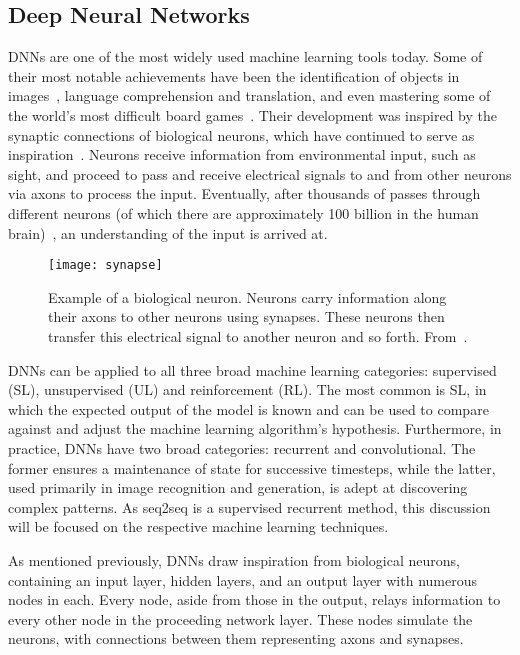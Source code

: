 \subsection{Deep Neural Networks}\label{dnn}
DNNs are one of the most widely used machine learning tools today. Some of their most notable achievements have been the identification of objects in images~\cite{LeCun1989}, language comprehension and translation\cite{Mikolov2010,Mikolov2011}, and even mastering some of the world's most difficult board games~\cite{Silver2016}. Their development was inspired by the synaptic connections of biological neurons, which have continued to serve as inspiration~\cite{Schmidhuber2015}. Neurons receive information from environmental input, such as sight, and proceed to pass and receive electrical signals to and from other neurons via axons to process the input. Eventually, after thousands of passes through different neurons (of which there are approximately 100 billion in the human brain)~\cite{Goodfellow2016}, an understanding of the input is arrived at.

\begin{SCfigure}[1][h]
  \caption[Example of a biological neuron]{Example of a biological neuron. Neurons carry information along their axons to other neurons using synapses. These neurons then transfer this electrical signal to another neuron and so forth. From~\cite{NationalInstituteofAging2011}.}
  \texttt{[image: synapse]}
  \label{fig:synapse}
\end{SCfigure}

DNNs can be applied to all three broad machine learning categories: supervised (SL), unsupervised (UL) and reinforcement (RL). The most common is SL, in which the expected output of the model is known and can be used to compare against and adjust the machine learning algorithm's hypothesis. Furthermore, in practice, DNNs have two broad categories: recurrent and convolutional. The former ensures a maintenance of state for successive timesteps, while the latter, used primarily in image recognition and generation, is adept at discovering complex patterns.  As seq2seq is a supervised recurrent method, this discussion will be focused on the respective machine learning techniques.

As mentioned previously, DNNs draw inspiration from biological neurons, containing an input layer, hidden layers, and an output layer with numerous nodes in each. Every node, aside from those in the output, relays information to every other node in the proceeding network layer. These nodes simulate the neurons, with connections between them representing axons and synapses.

